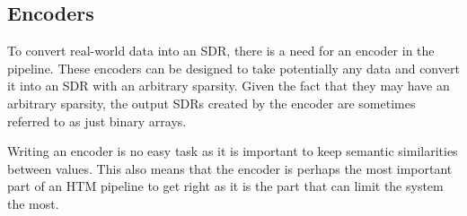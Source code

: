 \subsection{Encoders}
\label{sec:encoders}
To convert real-world data into an SDR, there is a need for an encoder in the pipeline. These encoders can be designed to take potentially any data and convert it into an SDR with an arbitrary sparsity. Given the fact that they may have an arbitrary sparsity, the output SDRs created by the encoder are sometimes referred to as just binary arrays.\par
Writing an encoder is no easy task as it is important to keep semantic similarities between values. This also means that the encoder is perhaps the most important part of an HTM pipeline to get right as it is the part that can limit the system the most.\par

